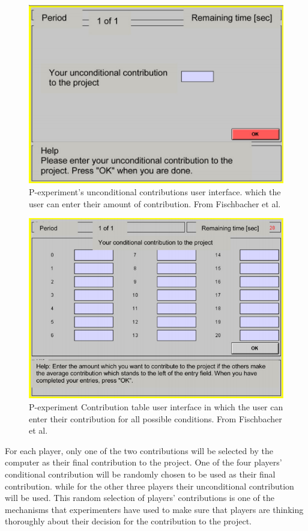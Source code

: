 \begin{figure}[!h]
	\centering
	\includegraphics[scale=0.55]{images/chapter3/pgg1RoundOfGame.png}
	\caption{P-experiment's unconditional contributions user interface. which the user can enter their amount of contribution.
		From Fischbacher et al. \cite{Fischbacher2012}}
	\label{fig:pgg1RoundOfGame}
\end{figure}
\begin{figure}[!h]
	\centering
	\includegraphics[scale=0.45]{images/chapter3/pgg20Questions.png}
	\caption{P-experiment Contribution table user interface in which the user can enter their contribution for all possible conditions. 
		From Fischbacher et al. \cite{Fischbacher2012}}
	\label{fig:pgg20Questions}
\end{figure}

For each player, only one of the two contributions will be selected by the computer as their final contribution to the project. One of the four players' conditional contribution will be randomly chosen to be used as their final contribution. while for the other three players their unconditional contribution will be used. This random selection of players' contributions is one of the mechanisms that experimenters have used to make sure that players are thinking thoroughly about their decision for the contribution to the project.

